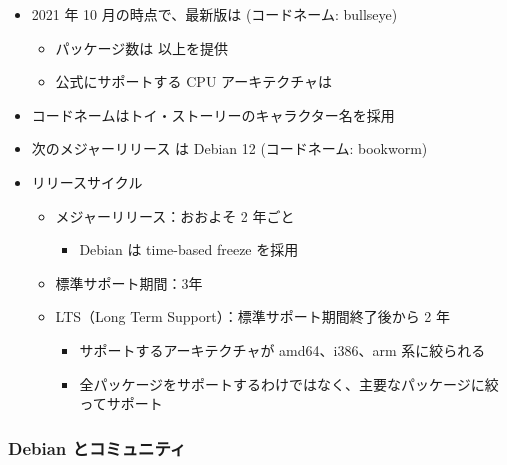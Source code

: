 \documentclass[mingoth,a4paper]{jsarticle}
\begin{document}
\begin{itemize}
\item 2021 年 10 月の時点で、最新版は {\color{red}{Debian 11.1}} (コードネーム: bullseye)
  \begin{itemize}
  \item パッケージ数は {\color{red}{約59,551}} 以上を提供
  \item 公式にサポートする CPU アーキテクチャは {\color{red}{9}}
  \end{itemize}
\item コードネームはトイ・ストーリーのキャラクター名を採用
\item 次のメジャーリリース は Debian 12 (コードネーム: {\color{red}{}}bookworm)
\end{itemize}


\begin{itemize}
\item リリースサイクル

  \begin{itemize}
  \item メジャーリリース：おおよそ 2 年ごと
    \begin{itemize}
    \item Debian は time-based freeze を採用
    \end{itemize}
  \item 標準サポート期間：3年
  \item LTS（Long Term Support）：標準サポート期間終了後から 2 年
    \begin{itemize}
    \item サポートするアーキテクチャが amd64、i386、arm 系に絞られる
    \item 全パッケージをサポートするわけではなく、主要なパッケージに絞ってサポート
    \end{itemize}
  \end{itemize}
\end{itemize}


\subsubsection{Debian とコミュニティ}
\end{document}
